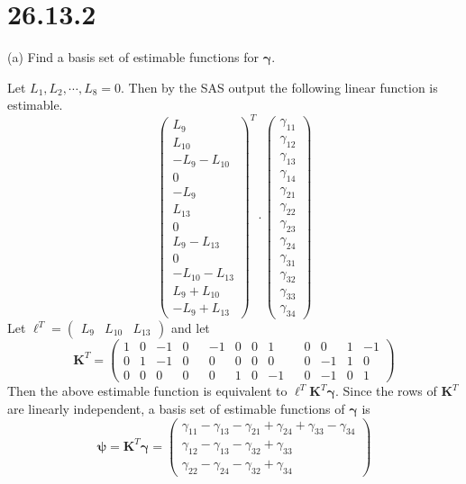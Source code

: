 \section*{26.13.2}
(a) Find a basis set of estimable functions for $\bm\gamma$.

\bigskip
\noindent
Let $L_1,L_2,\cdots,L_8=0$. Then by the SAS output the following
linear function is estimable.
\[
\begin{pmatrix}
L_9\\
L_{10}\\
-L_9-L_{10}\\
0\\
-L_9\\
L_{13}\\
0\\
L_9-L_{13}\\
0\\
-L_{10}-L_{13}\\
L_9+L_{10}\\
-L_9+L_{13}
\end{pmatrix}^T
\cdot
\begin{pmatrix}
\gamma_{11}\\
\gamma_{12}\\
\gamma_{13}\\
\gamma_{14}\\
\gamma_{21}\\
\gamma_{22}\\
\gamma_{23}\\
\gamma_{24}\\
\gamma_{31}\\
\gamma_{32}\\
\gamma_{33}\\
\gamma_{34}
\end{pmatrix}
\]
Let $\bm\ell^T=\begin{pmatrix}L_9 & L_{10} & L_{13}\end{pmatrix}$
and let
\[
\mathbf K^T=
\left(\begin{array}{rrrrrrrrrrrrrr}
1 & 0 & -1 & 0 & & -1 & 0 & 0 & 1 & & 0 & 0 & 1 & -1\\
0 & 1 & -1 & 0 & & 0 & 0 & 0 & 0 & & 0 & -1 & 1 & 0\\
0 & 0 & 0 & 0 & & 0 & 1 & 0 & -1 & & 0 & -1 & 0 & 1
\end{array}\right)
\]
Then the above estimable function is equivalent to
$\bm\ell^T\mathbf K^T\bm\gamma$.
Since the rows of $\mathbf K^T$ are linearly independent,
a basis set of estimable functions of $\bm\gamma$ is
\[
\bm\psi=\mathbf K^T\bm\gamma=
\begin{pmatrix}
\gamma_{11}-\gamma_{13}-\gamma_{21}+\gamma_{24}
+\gamma_{33}-\gamma_{34}\\
\gamma_{12}-\gamma_{13}-\gamma_{32}+\gamma_{33}\\
\gamma_{22}-\gamma_{24}-\gamma_{32}+\gamma_{34}
\end{pmatrix}
\]

